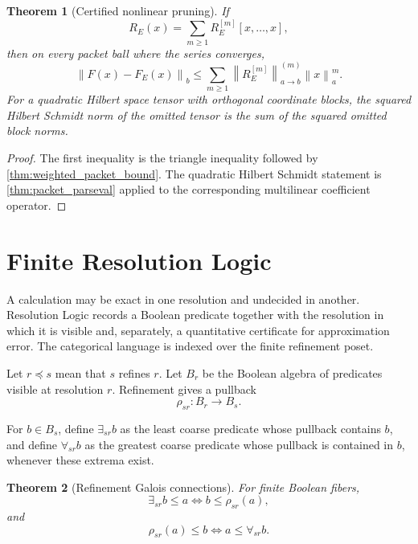 \documentclass{aomart}
\newtheorem{theorem}{Theorem}[section]
\theoremstyle{definition}
\theoremstyle{remark}
\newcommand{\norm}[1]{\left\lVert#1\right\rVert}
\begin{document}
\begin{theorem}[Certified nonlinear pruning]\label{thm:nonlinear_pruning}
If
\[
 R_E(x)=\sum_{m\ge1}R_E^{[m]}[x,\ldots,x],
\]
then on every packet ball where the series converges,
\[
 \boxed{
 \norm{F(x)-F_E(x)}_b
 \le
 \sum_{m\ge1}
 \norm{R_E^{[m]}}^{(m)}_{a\to b}
 \norm{x}_a^m.
 }
\]
For a quadratic Hilbert space tensor with orthogonal coordinate blocks, the squared Hilbert Schmidt norm of the omitted tensor is the sum of the squared omitted block norms.
\end{theorem}

\begin{proof}
The first inequality is the triangle inequality followed by \cref{thm:weighted_packet_bound}. The quadratic Hilbert Schmidt statement is \cref{thm:packet_parseval} applied to the corresponding multilinear coefficient operator.
\end{proof}

\section{Finite Resolution Logic}\label{sec:logic}

A calculation may be exact in one resolution and undecided in another. Resolution Logic records a Boolean predicate together with the resolution in which it is visible and, separately, a quantitative certificate for approximation error. The categorical language is indexed over the finite refinement poset.

Let \(r\preceq s\) mean that \(s\) refines \(r\). Let \(B_r\) be the Boolean algebra of predicates visible at resolution \(r\). Refinement gives a pullback
\[
 \rho_{sr}:B_r\longrightarrow B_s.
\]

\begin{definition}\label{def:logic_adjoints}
For \(b\in B_s\), define \(\exists_{sr}b\) as the least coarse predicate whose pullback contains \(b\), and define \(\forall_{sr}b\) as the greatest coarse predicate whose pullback is contained in \(b\), whenever these extrema exist.
\end{definition}

\begin{theorem}[Refinement Galois connections]\label{thm:logic_galois}
For finite Boolean fibers,
\[
 \boxed{
 \exists_{sr}b\le a
 \iff
 b\le\rho_{sr}(a),
 }
\]
and
\[
 \boxed{
 \rho_{sr}(a)\le b
 \iff
 a\le\forall_{sr}b.
 }
\]
\end{theorem}
\end{document}
